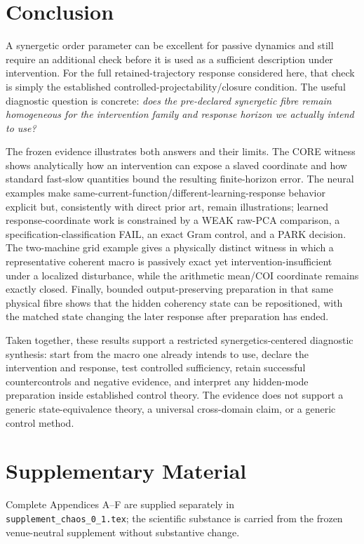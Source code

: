 \section{Conclusion}

A synergetic order parameter can be excellent for passive dynamics and still require an additional check before it is used as a sufficient description under intervention. For the full retained-trajectory response considered here, that check is simply the established controlled-projectability/closure condition. The useful diagnostic question is concrete: \emph{does the pre-declared synergetic fibre remain homogeneous for the intervention family and response horizon we actually intend to use?}

The frozen evidence illustrates both answers and their limits. The CORE witness shows analytically how an intervention can expose a slaved coordinate and how standard fast-slow quantities bound the resulting finite-horizon error. The neural examples make same-current-function/different-learning-response behavior explicit but, consistently with direct prior art, remain illustrations; learned response-coordinate work is constrained by a WEAK raw-PCA comparison, a specification-classification FAIL, an exact Gram control, and a PARK decision. The two-machine grid example gives a physically distinct witness in which a representative coherent macro is passively exact yet intervention-insufficient under a localized disturbance, while the arithmetic mean/COI coordinate remains exactly closed. Finally, bounded output-preserving preparation in that same physical fibre shows that the hidden coherency state can be repositioned, with the matched state changing the later response after preparation has ended.

Taken together, these results support a restricted synergetics-centered diagnostic synthesis: start from the macro one already intends to use, declare the intervention and response, test controlled sufficiency, retain successful countercontrols and negative evidence, and interpret any hidden-mode preparation inside established control theory. The evidence does not support a generic state-equivalence theory, a universal cross-domain claim, or a generic control method.

\section*{Supplementary Material}
Complete Appendices A--F are supplied separately in \texttt{supplement\_chaos\_0\_1.tex}; the scientific substance is carried from the frozen venue-neutral supplement without substantive change.


